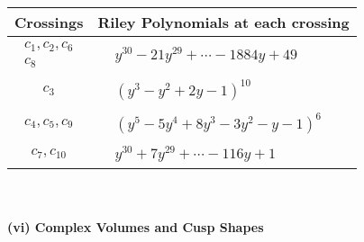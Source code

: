\documentclass[1p]{elsarticle_modified}
\theoremstyle{definition}
\begin{document}
\begin{tabular}{m{50pt}|m{274pt}}
Crossings & \hspace{64pt}Riley Polynomials at each crossing \\
\hline $$\begin{aligned}c_{1},c_{2},c_{6}\\c_{8}\end{aligned}$$&$\begin{aligned}
&y^{30}-21 y^{29}+\cdots-1884 y+49
\end{aligned}$\\
\hline $$\begin{aligned}c_{3}\end{aligned}$$&$\begin{aligned}
&(y^3- y^2+2 y-1)^{10}
\end{aligned}$\\
\hline $$\begin{aligned}c_{4},c_{5},c_{9}\end{aligned}$$&$\begin{aligned}
&(y^5-5 y^4+8 y^3-3 y^2- y-1)^6
\end{aligned}$\\
\hline $$\begin{aligned}c_{7},c_{10}\end{aligned}$$&$\begin{aligned}
&y^{30}+7 y^{29}+\cdots-116 y+1
\end{aligned}$\\
\hline
\end{tabular}\\~\\
\newpage\flushleft \textbf{(vi) Complex Volumes and Cusp Shapes}
\end{document}
